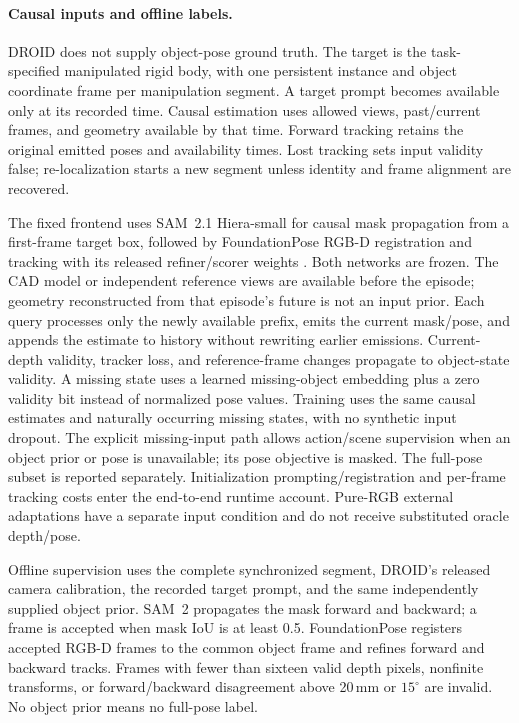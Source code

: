\paragraph{Causal inputs and offline labels.}
DROID does not supply object-pose ground truth. The target is the
task-specified manipulated rigid body, with one persistent instance and
object coordinate frame per manipulation segment. A target prompt becomes
available only at its recorded time. Causal estimation uses allowed views,
past/current frames, and geometry available by that time. Forward tracking
retains the original emitted poses and availability times. Lost tracking
sets input validity false; re-localization starts a new segment unless
identity and frame alignment are recovered.

The fixed frontend uses SAM~2.1 Hiera-small for causal mask propagation
from a first-frame target box, followed by FoundationPose RGB-D registration
and tracking with its released refiner/scorer weights
\cite{sam2,foundationpose}. Both networks are frozen. The CAD model or
independent reference views are available before the episode; geometry
reconstructed from that episode's future is not an input prior. Each query
processes only the newly available prefix, emits the current mask/pose,
and appends the estimate to history without rewriting earlier emissions.
Current-depth validity, tracker loss, and reference-frame changes propagate
to object-state validity. A missing state uses a learned missing-object
embedding plus a zero validity bit instead of normalized pose values.
Training uses the same causal estimates and naturally occurring missing
states, with no synthetic input dropout. The explicit missing-input path
allows action/scene supervision when an object prior or pose is unavailable;
its pose objective is masked. The full-pose subset is reported separately.
Initialization prompting/registration and per-frame tracking costs enter
the end-to-end runtime account. Pure-RGB external adaptations have a
separate input condition and do not receive substituted oracle depth/pose.

Offline supervision uses the complete synchronized segment, DROID's
released camera calibration, the recorded target prompt, and the same
independently supplied object prior. SAM~2 propagates the mask forward and
backward; a frame is accepted when mask IoU is at least 0.5. FoundationPose
registers accepted RGB-D frames to the common object frame and refines
forward and backward tracks. Frames with fewer than sixteen valid depth
pixels, nonfinite transforms, or forward/backward disagreement above
20\,mm or $15^\circ$ are invalid. No object prior means no full-pose label.

